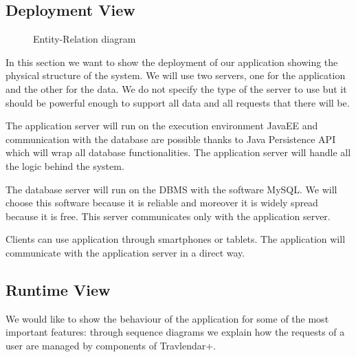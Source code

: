 \documentclass[12pt,titlepage]{article}
\begin{document}
\subsection{Deployment View}
\begin{figure}[H]
\centering
{}
\caption{Entity-Relation diagram}
\end{figure}

In  this section we want to show the deployment of our application showing the physical structure of the system.
We will use two servers, one for the application and the other for the data. We do not specify the type of the server to use but it should be powerful enough to support all data and all requests that there will be.

The application server will run on the execution environment JavaEE and communication with the database are possible thanks to Java Persistence API which will wrap all database functionalities.
The application server will handle all the logic behind the system.

The database server will run on the DBMS with the software MySQL. We will choose this software because it is reliable and moreover it is widely spread because it is free. This server communicates only with the application server.

Clients can use application through smartphones or tablets. The application will communicate with the application server in a direct way.

\clearpage
\newpage

\subsection{Runtime View}
We would like to show the behaviour of the application for some of the most important features: through sequence diagrams we explain how the requests of a user are managed by components of Travlendar+.
\end{document}

